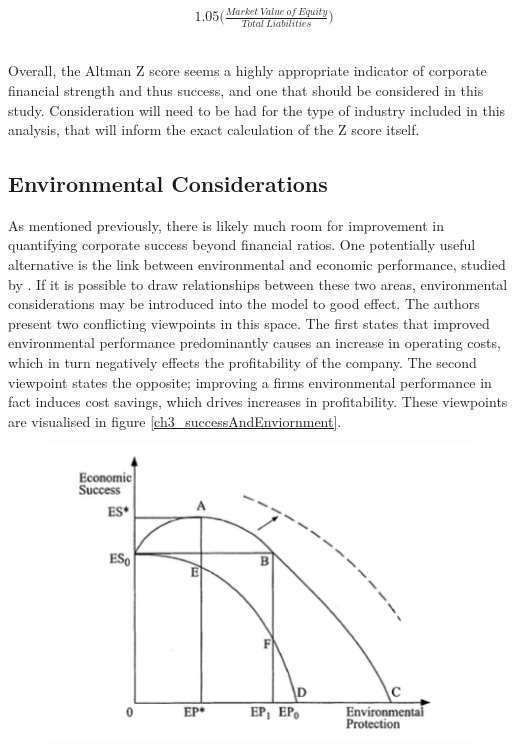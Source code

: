 {\begin {equation}
\begin{aligned}
		& 1.05\bigg({\frac{Market \ Value \ of \ Equity}{Total \ Liabilities}}\bigg) \ \\\\ 
\end{aligned}
\end{equation}\\
Overall, the Altman Z score seems a highly appropriate indicator of corporate financial strength and thus success, and one that should be considered in this study. Consideration will need to be had for the type of industry included in this analysis, that will inform the exact calculation of the Z score itself. }
\subsection{Environmental Considerations}
{As mentioned previously, there is likely much room for improvement in quantifying corporate success beyond financial ratios. One potentially useful alternative is the link between environmental and economic performance, studied by \cite{schaltegger2002link}. If it is possible to draw relationships between these two areas, environmental considerations may be introduced into the model to good effect. The authors present two conflicting viewpoints in this space. The first states that improved environmental performance predominantly causes an increase in operating costs, which in turn negatively effects the profitability of the company. The second viewpoint states the opposite; improving a firms environmental performance in fact induces cost savings, which drives increases in profitability. These viewpoints are visualised in figure \ref{ch3_successAndEnviornment}. 
\begin{figure}[h] 
\centering
\includegraphics[scale = 0.7]{images/ch3_successAndEnviornment.png}

\end{figure}}
